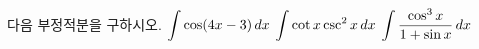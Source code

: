 다음 부정적분을 구하시오.
 $\displaystyle\int\cos(4x-3)\mkern3mu dx$
 $\displaystyle\int\cot x\csc^2 x\mkern3mu dx$
 $\displaystyle\int\dfrac{\cos^3 x}{1+\sin x}\mkern3mu dx$

